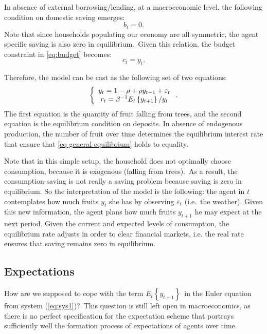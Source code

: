 \documentclass[a4paper,12pt]{article}%
\begin{document}
In absence of external borrowing/lending, at a macroeconomic level, the
following condition on domestic saving emerges:%
\begin{equation}
b_{t}=0. \label{eq general equilibrium}%
\end{equation}
Note that since households populating our economy are all symmetric, the agent
specific saving is also zero in equilibrium.\ Given this relation, the budget
constraint in \autoref{eq:budget} becomes:%
\begin{equation}
c_{t}=y_{t}.
\end{equation}


Therefore, the model can be cast as the following set of two equations:%
\begin{equation}
\left\{
\begin{array}
[c]{c}%
y_{t}=1-\rho+\rho y_{t-1}+\varepsilon_{t}\\
r_{t}=\beta^{-1}E_{t}\left\{  y_{t+1}\right\}  /y_{t}%
\end{array}
\right.  . \label{eq:sys1}%
\end{equation}
The first equation is the quantity of fruit falling from trees, and the second
equation is the equilibrium condition on deposits. In absence of endogenous
production, the number of fruit over time determines the equilibrium interest
rate that ensure that \autoref{eq general equilibrium} holds to equality.

Note that in this simple setup, the household does not optimally choose
consumption, because it is exogenous (falling from trees).\ As a result, the
consumption-saving is not really a saving problem because saving is zero in
equilibrium. So the interpretation of the model is the following: the agent in
$t$ contemplates how much fruits $y_{t}$ she has by observing $\varepsilon
_{t}$ (i.e.\ the weather). Given this new information, the agent plans how
much fruits $y_{t+1}$ he may expect at the next period. Given the current and
expected levels of consumption, the equilibrium rate adjusts in order to clear
financial markets, i.e. the real rate ensures that saving remains zero in equilibrium.

\subsection{Expectations}

How are we supposed to cope with the term $E_{t}\left\{  y_{t+1}\right\}
$\ in the Euler equation from system (\ref{eq:sys1})?\ This question is still
left open in macroeconomics, as there is no perfect specification for the
expectation scheme that portrays sufficiently well the formation process of
expectations of agents over time.
\end{document}
